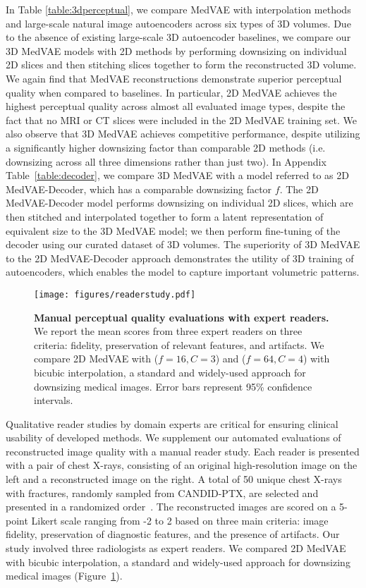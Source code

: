 In Table \ref{table:3dperceptual}, we compare MedVAE with interpolation methods and large-scale natural image autoencoders across six types of 3D volumes. Due to the absence of existing large-scale 3D autoencoder baselines, we compare our 3D MedVAE models with 2D methods by performing downsizing on individual 2D slices and then stitching slices together to form the reconstructed 3D volume. We again find that MedVAE reconstructions demonstrate superior perceptual quality when compared to baselines. In particular, 2D MedVAE achieves the highest perceptual quality across almost all evaluated image types, despite the fact that no MRI or CT slices were included in the 2D MedVAE training set. We also observe that 3D MedVAE achieves competitive performance, despite utilizing a significantly higher downsizing factor than comparable 2D methods (i.e. downsizing across all three dimensions rather than just two). In Appendix Table~\ref{table:decoder}, we compare 3D MedVAE with a model referred to as 2D MedVAE-Decoder, which has a comparable downsizing factor $f$. The 2D MedVAE-Decoder model performs downsizing on individual 2D slices, which are then stitched and interpolated together to form a latent representation of equivalent size to the 3D MedVAE model; we then perform fine-tuning of the decoder using our curated dataset of 3D volumes. The superiority of 3D MedVAE to the 2D MedVAE-Decoder approach demonstrates the utility of 3D training of autoencoders, which enables the model to capture important volumetric patterns. 

\begin{figure}[h]
\centering
\texttt{[image: figures/readerstudy.pdf]}
\caption{\textbf{Manual perceptual quality evaluations with expert readers.} We report the mean scores from three expert readers on three criteria: fidelity, preservation of relevant features, and artifacts. We compare 2D MedVAE with ($f=16,C=3$) and ($f=64,C=4$) with bicubic interpolation, a standard and widely-used approach for downsizing medical images. Error bars represent 95\% confidence intervals.}
\label{fig:readerstudy}
\end{figure}


Qualitative reader studies by domain experts are critical for ensuring clinical usability of developed methods. We supplement our automated evaluations of reconstructed image quality with a manual reader study. Each reader is presented with a pair of chest X-rays, consisting of an original high-resolution image on the left and a reconstructed image on the right. A total of 50 unique chest X-rays with fractures, randomly sampled from CANDID-PTX, are selected and presented in a randomized order~\cite{feng2021candid}. The reconstructed images are scored on a 5-point Likert scale ranging from -2 to 2 based on three main criteria: image fidelity, preservation of diagnostic features, and the presence of artifacts. Our study involved three radiologists as expert readers. We compared 2D MedVAE with bicubic interpolation, a standard and widely-used approach for downsizing medical images (Figure~\ref{fig:readerstudy}).

